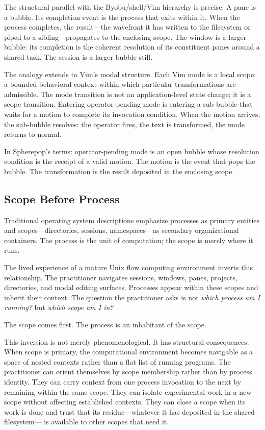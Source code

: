 \documentclass[12pt, a4paper]{article}
\begin{document}
The structural parallel with the Byobu/shell/Vim hierarchy is
precise. A pane is a bubble. Its completion event is the
process that exits within it. When the process completes, the
result---the wavefront it has written to the filesystem or
piped to a sibling---propagates to the enclosing scope. The
window is a larger bubble: its completion is the coherent
resolution of its constituent panes around a shared task. The
session is a larger bubble still.

The analogy extends to Vim's modal structure. Each Vim mode is
a local scope: a bounded behavioral context within which
particular transformations are admissible. The mode transition
is not an application-level state change; it is a scope
transition. Entering operator-pending mode is entering a
sub-bubble that waits for a motion to complete its invocation
condition. When the motion arrives, the sub-bubble resolves:
the operator fires, the text is transformed, the mode returns
to normal.

In Spherepop's terms: operator-pending mode is an open bubble
whose resolution condition is the receipt of a valid motion.
The motion is the event that pops the bubble. The transformation
is the result deposited in the enclosing scope.

\subsection{Scope Before Process}

Traditional operating system descriptions emphasize processes
as primary entities and scopes---directories, sessions,
namespaces---as secondary organizational containers. The process
is the unit of computation; the scope is merely where it runs.

The lived experience of a mature Unix flow computing environment
inverts this relationship. The practitioner navigates sessions,
windows, panes, projects, directories, and modal editing
surfaces. Processes appear within these scopes and inherit
their context. The question the practitioner asks is not
\emph{which process am I running?} but \emph{which scope am I in?}

The scope comes first. The process is an inhabitant of the scope.

This inversion is not merely phenomenological. It has structural
consequences. When scope is primary, the computational environment
becomes navigable as a space of nested contexts rather than a
flat list of running programs. The practitioner can orient
themselves by scope membership rather than by process identity.
They can carry context from one process invocation to the next
by remaining within the same scope. They can isolate experimental
work in a new scope without affecting established contexts. They
can close a scope when its work is done and trust that its
residue---whatever it has deposited in the shared filesystem---
is available to other scopes that need it.
\end{document}
